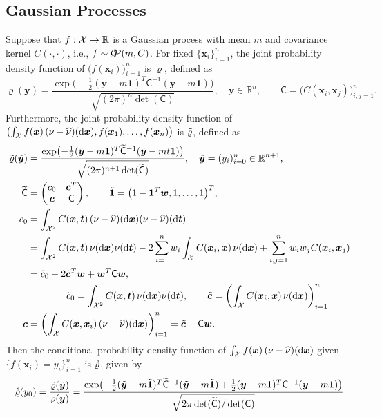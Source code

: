 \documentclass[graybox]{svmult}
\newcommand{\R}{\mathbb{R}} %
\newcommand{\bsone}{\boldsymbol{1}}  %
\newcommand{\bst}{\boldsymbol{t}}    %
\newcommand{\bsw}{\boldsymbol{w}}    %
\newcommand{\bsx}{\boldsymbol{x}}    %
\newcommand{\bsy}{\boldsymbol{y}}    %
\newcommand{\mC}{\mathsf{C}}
\DeclareMathOperator{\GP}{\cg\!\!\cp}
\begin{document}
\subsection{Gaussian Processes}
Suppose that $f:\cx \to \R$ is a Gaussian process with mean $m$ and covariance kernel $C(\cdot,\cdot)$, i.e., $f \sim \GP(m,C)$.  For fixed $\{\bsx_i\}_{i=1}^n$, the joint probability density function of $\bigl(f(\bsx_i)\bigr)_{i=1}^n$ is $\varrho$, defined as 
\begin{equation*}
\varrho (\bsy) = \frac{\exp\bigl(-\frac 12 (\bsy - m \bsone)^T \mC^{-1} (\bsy - m \bsone) \bigr)}{\sqrt{(2 \pi)^n \det(\mC)}}, \quad \bsy \in \R^n, \qquad \mC = \bigl(C(\bsx_i,\bsx_j)\bigr)_{i,j=1}^n.
\end{equation*}
Furthermore, the joint probability density function of $\bigl(\int_{\cx} f(\bsx) \, (\nu -\hnu)(\D \bsx), f(\bsx_1), \ldots, f(\bsx_n)\bigr)$ is $\tilde{\varrho}$, defined as 
\begin{align*}
\tvarrho (\tbsy) &= \frac{\exp\bigl(-\frac 12 (\tbsy - m \tbsone)^T \tmC^{-1} (\tbsy - m t\bsone) \bigr)}{\sqrt{(2 \pi)^{n+1} \det(\tmC)}}, \quad \tbsy = (y_i)_{i=0}^n \in \R^{n+1}, \\
 \tmC &= \begin{pmatrix} c_0 & \bsc^T \\ \bsc & \mC \end{pmatrix}, \qquad \tbsone = \bigl(1 - \bsone^T\bsw,  1, \ldots, 1 \bigr)^T, \\
 c_0 &= \int_{\cx^2} C(\bsx,\bst) \, (\nu -\hnu)(\D\bsx)(\nu -\hnu)(\D\bst) \\ 
 & = \int_{\cx^2} C(\bsx,\bst) \, \nu (\D\bsx)\nu(\D\bst) - 2 \sum_{i=1}^n w_i \int_{\cx} C(\bsx_i,\bsx) \, \nu (\D\bsx) +  \sum_{i,j=1}^n w_i w_j C(\bsx_i,\bsx_j)\\
 & = \tc_0 -2 \tbsc^T \bsw + \bsw^T \mC \bsw,\\
 & \qquad \qquad   \tc_0 = \int_{\cx^2} C(\bsx,\bst) \, \nu (\D\bsx)\nu(\D\bst), \qquad 
 \tbsc = \biggl( \int_{\cx} C(\bsx_i,\bsx) \, \nu (\D\bsx)\biggr)_{i=1}^n \\
 \bsc &= \biggl( \int_{\cx} C(\bsx,\bsx_i) \, (\nu -\hnu)(\D \bsx)\biggr)_{i=1}^n 
 =  \tbsc - \mC \bsw.
\end{align*}
Then the conditional probability density function of $\int_{\cx} f(\bsx) \,  (\nu -\hnu)(\D \bsx)$ given $\{f(\bsx_i )= y_i\}_{i=1}^n$ is $\mathring{\varrho}$, given by
\begin{equation*}
\rvarrho(y_0)  = \frac{\tvarrho(\tbsy)}{\varrho(\bsy)}  = \frac{\exp\bigl(-\frac 12 (\tbsy - m \tbsone)^T \tmC^{-1} (\tbsy - m \tbsone) + \frac 12 (\bsy - m \bsone)^T \mC^{-1} (\bsy - m \bsone)\bigr)}{\sqrt{2 \pi \det(\tmC)/\det(\mC)}}
\end{equation*}
\end{document}
